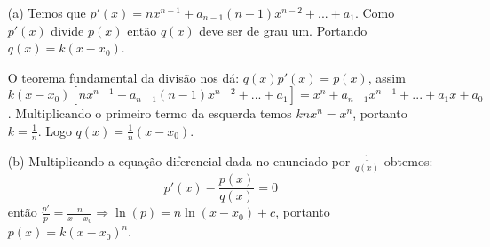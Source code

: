 \begin{enumerate}

\item[(a)] Temos que $p'(x)=nx^{n-1}+a_{n-1}(n-1)x^{n-2}+...+a_1$. Como $p'(x)$ divide $p(x)$ ent\~ao $q(x)$ deve ser de grau um. Portando $q(x)=k(x-x_0)$.

O teorema fundamental da divis\~ao nos d\'a: $q(x)p'(x)=p(x)$, assim $k(x-x_0)[nx^{n-1}+a_{n-1}(n-1)x^{n-2}+...+a_1]=x^n + a_{n-1} x^{n-1} + ... + a_1 x + a_0$. Multiplicando o primeiro termo da esquerda temos $knx^n=x^n$, portanto $k=\frac1{n}$. Logo $q(x)= \frac1{n}(x-x_0)$.

\item[(b)] Multiplicando a equa\c c\~ao diferencial dada no enunciado por $\frac1{q(x)}$ obtemos: $$p'(x)-\frac{p(x)}{q(x)}=0$$ ent\~ao $\frac{p'}{p}=\frac{n}{x-x_0} \Longrightarrow \ln(p)=n\ln(x-x_0)+c$, portanto $p(x)=k(x-x_0)^n$.

\end{enumerate}

